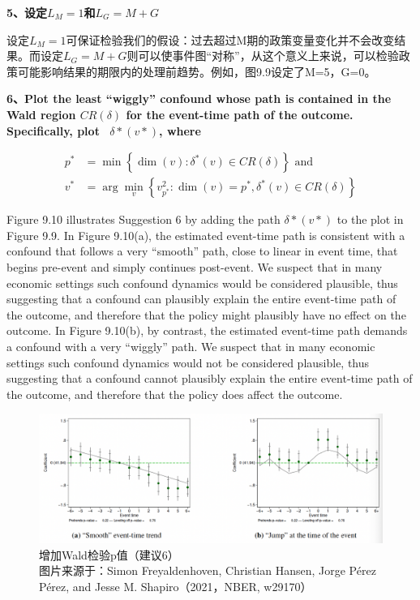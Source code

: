 \documentclass[cn,12pt,math=newtx,citestyle=gb7714-2015,bibstyle=gb7714-2015]{elegantbook}
\begin{document}
	\textbf{5、设定$L_M=1$和$L_G=M+G$}
	
	设定$L_M=1$可保证检验我们的假设：过去超过M期的政策变量变化并不会改变结果。而设定$L_G=M+G$则可以使事件图“对称”，从这个意义上来说，可以检验政策可能影响结果的期限内的处理前趋势。例如，图9.9设定了M=5，G=0。


	\textbf{6、Plot the least “wiggly” confound whose path is contained in the Wald region $CR(\delta)$ for the event-time path of the outcome. Specifically, plot  $\delta*(v*)$, where}
		
		\begin{equation}
			\begin{aligned}
				p^{*} &=\min \left\{\operatorname{dim}(v): \delta^{*}(v) \in C R(\delta)\right\} \text { and } \\
				v^{*} &=\arg \min _{v}\left\{v_{p^{*}}^{2}: \operatorname{dim}(v)=p^{*}, \delta^{*}(v) \in C R(\delta)\right\}
			\end{aligned}
		\end{equation}
	
	Figure 9.10 illustrates Suggestion 6 by adding the path $\delta*(v*)$ to the plot in Figure 9.9. In Figure 9.10(a), the estimated event-time path is consistent with a confound that follows a very “smooth” path, close to linear in event time, that begins pre-event and simply continues post-event. We suspect that in many economic settings such confound dynamics would be considered plausible, thus suggesting that a confound can plausibly explain the entire event-time path of the outcome, and therefore that the policy might plausibly have no effect on the outcome. In Figure 9.10(b), by contrast, the estimated event-time path demands a confound with a very “wiggly” path. We suspect that in many economic settings such confound dynamics would not be considered plausible, thus suggesting that a confound cannot plausibly explain the entire event-time path of the outcome, and therefore that the policy does affect the outcome.
	
	\begin{figure}[tbph]
		\centering
		\includegraphics[width=1\linewidth]{sug6}
		\caption{增加Wald检验p值（建议6）\\ 图片来源于：Simon Freyaldenhoven, Christian Hansen, Jorge Pérez Pérez, and Jesse M. Shapiro（2021，NBER, w29170）}
		\label{fig:sug6}
	\end{figure}
		
\end{document}
